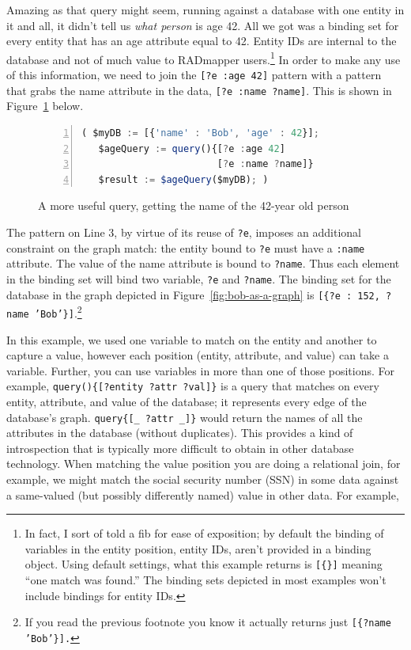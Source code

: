 \documentclass[9pt,letterpaper]{article}
\newcommand{\stt}[1]{\texttt{#1}} %
\begin{document}
Amazing as that query might seem, running against a database with one entity in it and all, it didn't tell us \textit{what person} is age 42.
All we got was a binding set for every entity that has an age attribute equal to 42.
Entity IDs are internal to the database and not of much value to RADmapper users.\footnote{In fact, I sort of told a fib for ease of exposition; by default the binding of variables in the entity position, entity IDs, aren't provided in a binding object.
  Using default settings, what this example returns is \stt{[\{\}]} meaning ``one match was found.''
The binding sets depicted in most examples won't include bindings for entity IDs.}
In order to make any use of this information, we need to join the \stt{[?e :age 42]} pattern with a pattern that grabs the name attribute in the data, \stt{[?e :name ?name]}.
This is shown in Figure~\ref{code:bob-age-more} below.

\begin{figure}[H]
    \caption{A more useful query, getting the name of the 42-year old person}
    \label{code:bob-age-more}
\begin{lstlisting}[language=JavaScript,numberstyle=\scriptsize,basicstyle=\ttfamily\scriptsize,numbers=left,stepnumber=1,breaklines=true]
 ( $myDB := [{'name' : 'Bob', 'age' : 42}];
   $ageQuery := query(){[?e :age 42]
                        [?e :name ?name]}
   $result := $ageQuery($myDB); )
\end{lstlisting}
\end{figure} \vspace{-2em}

The pattern on Line 3, by virtue of its reuse of \stt{?e}, imposes an additional constraint on the graph match: the entity bound to \stt{?e} must have a \stt{:name} attribute.
The value of the name attribute is bound to \stt{?name}.
Thus each element in the binding set will bind two variable, \stt{?e} and \stt{?name}.
The binding set for the database in the graph depicted in Figure~\ref{fig:bob-as-a-graph} is \stt{[\{?e : 152, ?name 'Bob'\}]}.\footnote{If you read the previous footnote you know it actually returns just \stt{[\{?name 'Bob'\}].}}

In this example, we used one variable to match on the entity and another to capture a value, however each position (entity, attribute, and value) can take a variable.
Further, you can use variables in more than one of those positions.
For example, \stt{query()\{[?entity ?attr ?val]\}} is a query that matches on every entity, attribute, and value of the database; it represents every edge of the database's graph.
\stt{query\{[\_ ?attr \_]\}} would return the names of all the attributes in the database (without duplicates). %
This provides a kind of introspection that is typically more difficult to obtain in other database technology.
When matching the value position you are doing a relational join, for example, we might match the social security number (SSN) in
some data against a same-valued (but possibly differently named) value in other data.
For example,
\end{document}
